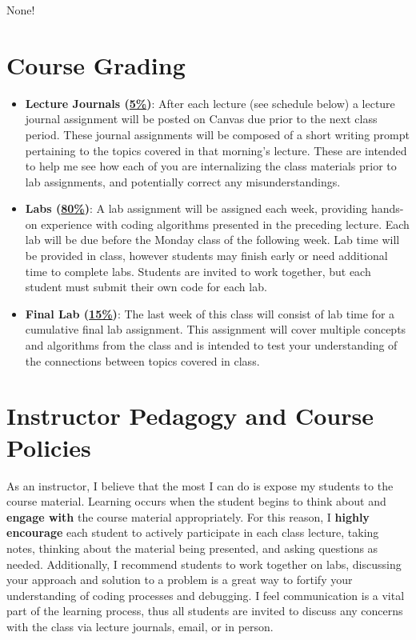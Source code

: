 \documentclass[11pt]{article}
\begin{document}
None!




\section*{Course Grading}
\begin{itemize}
	\item \textbf{Lecture Journals (\underline{5\%})}: After each lecture (see schedule below) a lecture journal assignment will be posted on Canvas due prior to the next class period. These journal assignments will be composed of a short writing prompt pertaining to the topics covered in that morning's lecture. These are intended to help me see how each of you are internalizing the class materials prior to lab assignments, and potentially correct any misunderstandings.
	\item \textbf{Labs (\underline{80\%})}: A lab assignment will be assigned each week, providing hands-on experience with coding algorithms presented in the preceding lecture. Each lab will be due before the Monday class of the following week. Lab time will be provided in class, however students may finish early or need additional time to complete labs. Students are invited to work together, but each student must submit their own code for each lab.
	\item \textbf{Final Lab (\underline{15\%})}: The last week of this class will consist of lab time for a cumulative final lab assignment. This assignment will cover multiple concepts and algorithms from the class and is intended to test your understanding of the connections between topics covered in class.
\end{itemize}


\section*{Instructor Pedagogy and Course Policies}
As an instructor, I believe that the most I can do is expose my students to the course material. Learning occurs when the student begins to think about and \textbf{engage with} the course material appropriately. For this reason, I \textbf{highly encourage} each student to actively participate in each class lecture, taking notes, thinking about the material being presented, and asking questions as needed.  Additionally, I recommend students to work together on labs, discussing your approach and solution to a problem is a great way to fortify your understanding of coding processes and debugging. I feel communication is a vital part of the learning process, thus all students are invited to discuss any concerns with the class via lecture journals, email, or in person.
\bigskip
\end{document}
